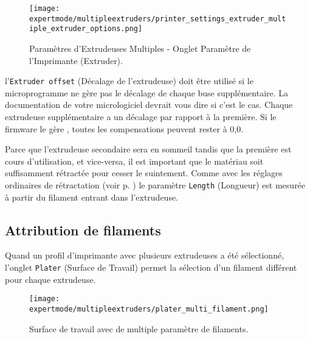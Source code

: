 \begin{figure}[H]
\centering
\texttt{[image: expertmode/multipleextruders/printer\_settings\_extruder\_multiple\_extruder\_options.png]}
\caption{Param\`etres d'Extrudeuses Multiples - Onglet Param\`etre de l'Imprimante (Extruder).}
\label{fig:printer_settings_extruder_multiple_extruder_options}
\end{figure}


l'\texttt{Extruder offset} (D\'ecalage de l'extrudeuse) doit \^etre utilis\'e si le microprogramme ne g\`ere pas le d\'ecalage de chaque buse suppl\'ementaire. La documentation de votre micrologiciel devrait vous dire si c'est le cas. Chaque extrudeuse suppl\'ementaire a un d\'ecalage par rapport \`a la premi\`ere. Si le firmware le g\`ere , toutes les compensations peuvent rester \`a 0,0.

Parce que l'extrudeuse secondaire sera en sommeil tandis que la premi\`ere est cours d'utilisation, et vice-versa, il est important que le mat\'eriau soit suffisamment r\'etract\'ee pour cesser le suintement.  Comme avec les r\'eglages ordinaires de r\'etractation (voir p. \pageref{fig:retraction_settings}) le param\`etre \texttt{Length} (Longueur) est mesur\'ee \`a partir du filament entrant dans l'extrudeuse.


\subsection{Attribution de filaments} %
\label{sub:assigning_filaments}
Quand un profil d'imprimante avec plusieurs extrudeuses a \'et\'e s\'electionn\'e, l'onglet \texttt{Plater} (Surface de Travail) permet la s\'election d'un filament diff\'erent pour chaque extrudeuse.

\begin{figure}[H]
\centering
\texttt{[image: expertmode/multipleextruders/plater\_multi\_filament.png]}
\caption{Surface de travail avec de multiple param\`etre de filaments.}
\label{fig:plater_multi_filament}
\end{figure}


